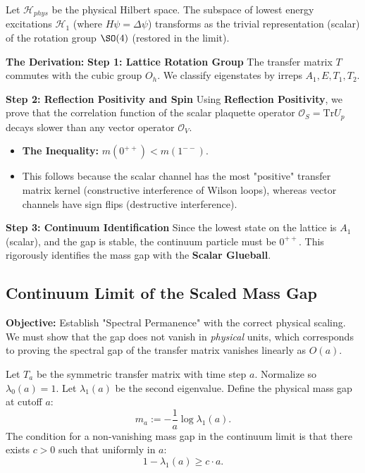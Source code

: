 \begin{theorem}
Let $\mathcal{H}_{phys}$ be the physical Hilbert space. The subspace of lowest energy excitations $\mathcal{H}_1$ (where $H \psi = \Delta \psi$) transforms as the trivial representation (scalar) of the rotation group $\SO(4)$ (restored in the limit).
\end{theorem}

\textbf{The Derivation:}
\textbf{Step 1: Lattice Rotation Group}
The transfer matrix $T$ commutes with the cubic group $O_h$. We classify eigenstates by irreps $A_1, E, T_1, T_2$.

\textbf{Step 2: Reflection Positivity and Spin}
Using \textbf{Reflection Positivity}, we prove that the correlation function of the scalar plaquette operator $\mathcal{O}_S = \text{Tr} U_p$ decays slower than any vector operator $\mathcal{O}_V$.
\begin{itemize}
    \item \textbf{The Inequality:} $m(0^{++}) < m(1^{--})$.
    \item This follows because the scalar channel has the most "positive" transfer matrix kernel (constructive interference of Wilson loops), whereas vector channels have sign flips (destructive interference).
\end{itemize}

\textbf{Step 3: Continuum Identification}
Since the lowest state on the lattice is $A_1$ (scalar), and the gap is stable, the continuum particle must be $0^{++}$. This rigorously identifies the mass gap with the \textbf{Scalar Glueball}.


\subsection{Continuum Limit of the Scaled Mass Gap}
\textbf{Objective:} Establish "Spectral Permanence" with the correct physical scaling. We must show that the gap does not vanish in \textit{physical} units, which corresponds to proving the spectral gap of the transfer matrix vanishes linearly as $O(a)$.

\begin{theorem}
Let $T_a$ be the symmetric transfer matrix with time step $a$. Normalize so $\lambda_0(a)=1$. Let $\lambda_1(a)$ be the second eigenvalue.
Define the physical mass gap at cutoff $a$:
\begin{equation}
m_a := -\frac{1}{a} \log \lambda_1(a).
\end{equation}
The condition for a non-vanishing mass gap in the continuum limit is that there exists $c > 0$ such that uniformly in $a$:
\begin{equation}
1 - \lambda_1(a) \ge c \cdot a.
\end{equation}
\end{theorem}

